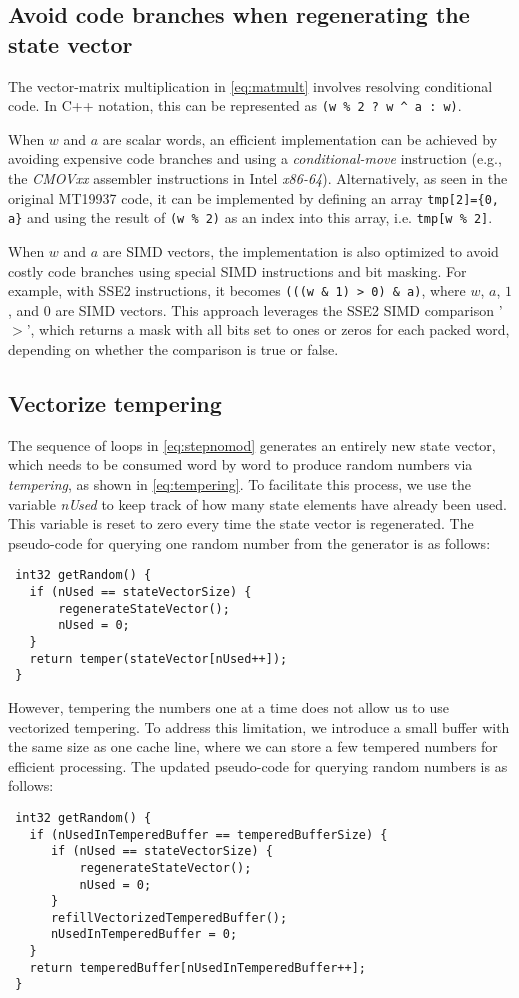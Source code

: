 \documentclass[preprint,1p,times]{elsarticle}
\begin{document}
\subsection{Avoid code branches when regenerating the state vector}
\noindent The vector-matrix multiplication in \eqref{eq:matmult} involves resolving conditional code. In C++ notation, this can be represented as \lstinline{(w % 2 ? w ^ a : w)}.

\noindent When $w$ and $a$ are scalar words, an efficient implementation can be achieved by avoiding expensive code branches and using a \textit{conditional-move} instruction (e.g., the \textit{CMOVxx} assembler instructions in Intel \textit{x86-64}). Alternatively, as seen in the original MT19937 code, it can be implemented by defining an array \lstinline|tmp[2]={0, a}| and using the result of \lstinline{(w % 2)} as an index into this array, i.e. \lstinline{tmp[w % 2]}.

\noindent When $w$ and $a$ are SIMD vectors, the implementation is also optimized to avoid costly code branches using special SIMD instructions and bit masking. For example, with SSE2 instructions, it becomes \lstinline{(((w & 1) > 0) & a)}, where $w$, $a$, $1$, and $0$ are SIMD vectors. This approach leverages the SSE2 SIMD comparison '$>$', which returns a mask with all bits set to ones or zeros for each packed word, depending on whether the comparison is true or false.

\subsection{Vectorize tempering}
\noindent The sequence of loops in \eqref{eq:stepnomod} generates an entirely new state vector, which needs to be consumed word by word to produce random numbers via \textit{tempering}, as shown in \eqref{eq:tempering}. To facilitate this process, we use the variable \textit{nUsed} to keep track of how many state elements have already been used. This variable is reset to zero every time the state vector is regenerated. The pseudo-code for querying one random number from the generator is as follows:
\begin{verbatim}
 int32 getRandom() {
   if (nUsed == stateVectorSize) {
       regenerateStateVector();
       nUsed = 0;
   }
   return temper(stateVector[nUsed++]);
 }
\end{verbatim}
However, tempering the numbers one at a time does not allow us to use vectorized tempering. To address this limitation, we introduce a small buffer with the same size as one cache line, where we can store a few tempered numbers for efficient processing. The updated pseudo-code for querying random numbers is as follows:
\begin{verbatim}
 int32 getRandom() {
   if (nUsedInTemperedBuffer == temperedBufferSize) {
      if (nUsed == stateVectorSize) {
          regenerateStateVector();
          nUsed = 0;
      }
      refillVectorizedTemperedBuffer();
      nUsedInTemperedBuffer = 0;
   }
   return temperedBuffer[nUsedInTemperedBuffer++];
 }
\end{verbatim}
\end{document}
